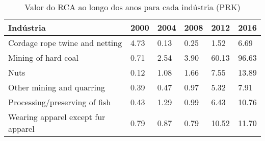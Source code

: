 \begin{table}
\centering
\caption{Valor do RCA ao longo dos anos para cada indústria (PRK)}
\begin{tabular}{p{6cm}p{1.5cm}p{1.5cm}p{1.5cm}p{1.5cm}p{1.5cm}}
\toprule
                         Indústria & 2000 & 2004 & 2008 &  2012 &  2016 \\
\midrule
    Cordage rope twine and netting & 4.73 & 0.13 & 0.25 &  1.52 &  6.69 \\
               Mining of hard coal & 0.71 & 2.54 & 3.90 & 60.13 & 96.63 \\
                              Nuts & 0.12 & 1.08 & 1.66 &  7.55 & 13.89 \\
         Other mining and quarring & 0.39 & 0.47 & 0.97 &  5.32 &  7.91 \\
     Processing/preserving of fish & 0.43 & 1.29 & 0.99 &  6.43 & 10.76 \\
Wearing apparel except fur apparel & 0.79 & 0.87 & 0.79 & 10.52 & 11.70 \\
\bottomrule
\end{tabular}
\end{table}

